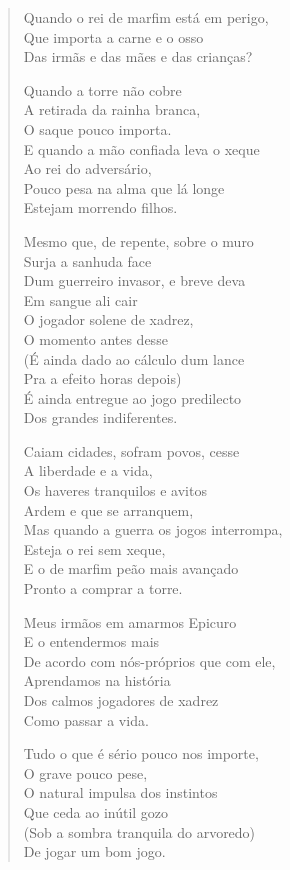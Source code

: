 \begin{verse}
Quando o rei de marfim está em perigo, \\
Que importa a carne e o osso \\
Das irmãs e das mães e das crianças?

Quando a torre não cobre \\
A retirada da rainha branca, \\
O saque pouco importa. \\
E quando a mão confiada leva o xeque \\
Ao rei do adversário, \\
Pouco pesa na alma que lá longe \\
Estejam morrendo filhos.

Mesmo que, de repente, sobre o muro \\
Surja a sanhuda face \\
Dum guerreiro invasor, e breve deva \\
Em sangue ali cair \\
O jogador solene de xadrez, \\
O momento antes desse \\
(É ainda dado ao cálculo dum lance \\
Pra a efeito horas depois) \\
É ainda entregue ao jogo predilecto \\
Dos grandes indiferentes.

Caiam cidades, sofram povos, cesse \\
A liberdade e a vida, \\
Os haveres tranquilos e avitos \\
Ardem e que se arranquem, \\
Mas quando a guerra os jogos interrompa, \\
Esteja o rei sem xeque, \\
E o de marfim peão mais avançado \\
Pronto a comprar a torre.

Meus irmãos em amarmos Epicuro \\
E o entendermos mais \\
De acordo com nós-próprios que com ele, \\
Aprendamos na história \\
Dos calmos jogadores de xadrez \\
Como passar a vida.

Tudo o que é sério pouco nos importe, \\
O grave pouco pese, \\
O natural impulsa dos instintos \\
Que ceda ao inútil gozo \\
(Sob a sombra tranquila do arvoredo) \\
De jogar um bom jogo.


\end{verse}
